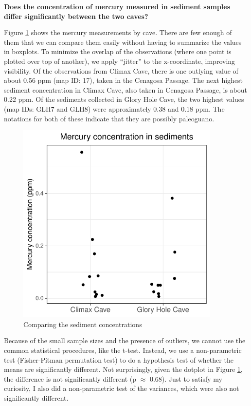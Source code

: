 \documentclass[11pt]{article}
\begin{document}
\noindent \textbf{Does the concentration of mercury measured in
  sediment samples differ significantly between the two caves?}

Figure \ref{fig:dotplot_compare_sediment} shows the mercury
measurements by cave.  There are few enough of them that we can
compare them easily without having to summarize the values in
boxplots.  To minimize the overlap of the observations (where one
point is plotted over top of another), we apply ``jitter'' to the
x-coordinate, improving visibility.  Of the observations from Climax
Cave, there is one outlying value of about 0.56 ppm (map ID: 17),
taken in the Cenagosa Passage.  The next highest sediment
concentration in Climax Cave, also taken in Cenagosa Passage, is about
0.22 ppm.  Of the sediments collected in Glory Hole Cave, the two
highest values (map IDs: GLH7 and GLH8) were approximately 0.38 and
0.18 ppm.  The notations for both of these indicate that they are
possibly paleoguano.
\begin{figure}[hb]
  \centering
  \includegraphics[height=4.0in]{dotplot_compare_sediment}
  \caption{Comparing the sediment concentrations}
  \label{fig:dotplot_compare_sediment}
\end{figure}

Because of the small sample sizes and the presence of outliers, we
cannot use the common statistical procedures, like the t-test.
Instead, we use a non-parametric test (Fisher-Pitman permutation test)
to do a hypothesis test of whether the means are significantly
different.  Not surprisingly, given the dotplot in Figure
\ref{fig:dotplot_compare_sediment}, the difference is not
significantly different (p $\approx$ 0.68).  Just to satisfy my
curiosity, I also did a non-parametric test of the variances, which
were also not significantly different.
\end{document}

